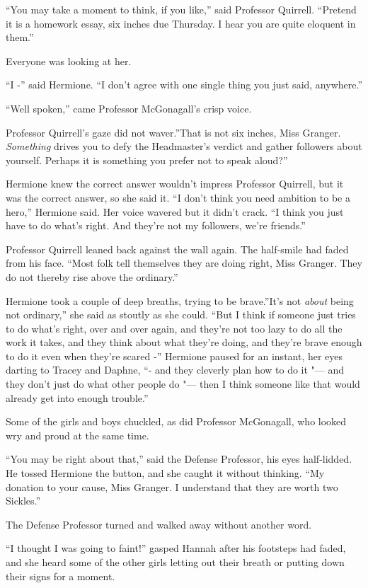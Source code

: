``You may take a moment to think, if you like,'' said Professor
Quirrell. ``Pretend it is a homework essay, six inches due Thursday. I
hear you are quite eloquent in them.''

Everyone was looking at her.

``I -'' said Hermione. ``I don't agree with one single thing you just
said, anywhere.''

``Well spoken,'' came Professor McGonagall's crisp voice.

Professor Quirrell's gaze did not waver.''That is not six inches, Miss
Granger. \emph{Something} drives you to defy the Headmaster's verdict
and gather followers about yourself. Perhaps it is something you prefer
not to speak aloud?''

Hermione knew the correct answer wouldn't impress Professor Quirrell,
but it was the correct answer, so she said it. ``I don't think you need
ambition to be a hero,'' Hermione said. Her voice wavered but it didn't
crack. ``I think you just have to do what's right. And they're not my
followers, we're friends.''

Professor Quirrell leaned back against the wall again. The half-smile
had faded from his face. ``Most folk tell themselves they are doing
right, Miss Granger. They do not thereby rise above the ordinary.''

Hermione took a couple of deep breaths, trying to be brave.''It's not
\emph{about} being not ordinary,'' she said as stoutly as she could.
``But I think if someone just tries to do what's right, over and over
again, and they're not too lazy to do all the work it takes, and they
think about what they're doing, and they're brave enough to do it even
when they're scared -'' Hermione paused for an instant, her eyes darting
to Tracey and Daphne, ``- and they cleverly plan how to do it "--- and they
don't just do what other people do "--- then I think someone like that
would already get into enough trouble.''

Some of the girls and boys chuckled, as did Professor McGonagall, who
looked wry and proud at the same time.

``You may be right about that,'' said the Defense Professor, his eyes
half-lidded. He tossed Hermione the button, and she caught it without
thinking. ``My donation to your cause, Miss Granger. I understand that
they are worth two Sickles.''

The Defense Professor turned and walked away without another word.

``I thought I was going to faint!'' gasped Hannah after his footsteps
had faded, and she heard some of the other girls letting out their
breath or putting down their signs for a moment.

